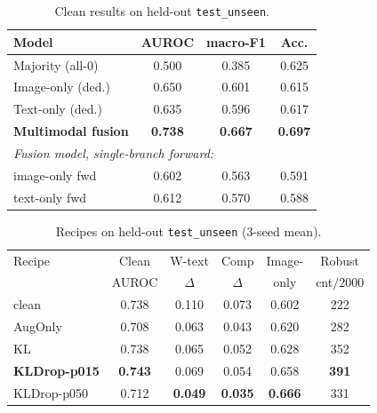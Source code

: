\documentclass{article}
\begin{document}
\begin{table}[tb]
\vskip -0.05in
\centering
\small
\begin{tabular*}{\columnwidth}{@{\extracolsep{\fill}}lccc@{}}
\toprule
Model & AUROC & macro-F1 & Acc. \\
\midrule
Majority (all-0)       & 0.500 & 0.385 & 0.625 \\
Image-only (ded.)      & 0.650 & 0.601 & 0.615 \\
Text-only (ded.)       & 0.635 & 0.596 & 0.617 \\
\textbf{Multimodal fusion}  & \textbf{0.738} & \textbf{0.667} & \textbf{0.697} \\
\midrule
\multicolumn{4}{l}{\emph{Fusion model, single-branch forward:}}\\
\quad image-only fwd   & 0.602 & 0.563 & 0.591 \\
\quad text-only fwd    & 0.612 & 0.570 & 0.588 \\
\bottomrule
\end{tabular*}
\vskip -0.08in
\caption{\footnotesize Clean results on held-out \texttt{test\_unseen}.}
\label{tab:baselines}
\end{table}

\begin{table}[tb]
\vskip -0.05in
\begin{center}\begin{small}
\setlength{\tabcolsep}{3pt}
\begin{tabular}{lccccc}
\toprule
Recipe & Clean & W-text & Comp & Image- & Robust \\
       & AUROC & $\Delta$ & $\Delta$ & only & cnt$/2000$ \\
\midrule
clean        & 0.738 & 0.110 & 0.073 & 0.602 & 222 \\
AugOnly      & 0.708 & 0.063 & 0.043 & 0.620 & 282 \\
KL           & 0.738 & 0.065 & 0.052 & 0.628 & 352 \\
\textbf{KLDrop-p015} & \textbf{0.743} & 0.069 & 0.054 & 0.658 & \textbf{391} \\
KLDrop-p050  & 0.712 & \textbf{0.049} & \textbf{0.035} & \textbf{0.666} & 331 \\
\bottomrule
\end{tabular}
\vskip -0.08in
\caption{\footnotesize Recipes on held-out \texttt{test\_unseen} ($3$-seed mean).}
\label{tab:recipes}
\end{small}\end{center}
\vskip -0.2in
\end{table}
\end{document}
